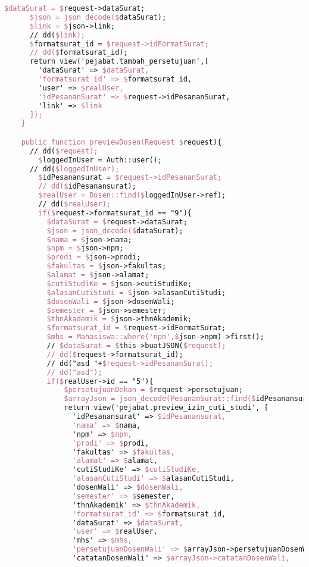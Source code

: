 \begin{lstlisting}[language=tex,basicstyle=\tiny,caption=PesanansuratController.php]
      $dataSurat = $request->dataSurat;
      $json = json_decode($dataSurat);
      $link = $json->link; 
      // dd($link);
      $formatsurat_id = $request->idFormatSurat;
      // dd($formatsurat_id);
      return view('pejabat.tambah_persetujuan',[
        'dataSurat' => $dataSurat,
        'formatsurat_id' => $formatsurat_id,
        'user' => $realUser,
        'idPesananSurat' => $request->idPesananSurat,
        'link' => $link
      ]);
    }

    public function previewDosen(Request $request){
      // dd($request);
        $loggedInUser = Auth::user();
      // dd($loggedInUser);
        $idPesanansurat = $request->idPesananSurat;
        // dd($idPesanansurat);
        $realUser = Dosen::find($loggedInUser->ref);
        // dd($realUser);
        if($request->formatsurat_id == "9"){
          $dataSurat = $request->dataSurat;
          $json = json_decode($dataSurat);
          $nama = $json->nama;
          $npm = $json->npm;
          $prodi = $json->prodi;
          $fakultas = $json->fakultas;
          $alamat = $json->alamat;
          $cutiStudiKe = $json->cutiStudiKe;
          $alasanCutiStudi = $json->alasanCutiStudi;
          $dosenWali = $json->dosenWali;
          $semester = $json->semester;
          $thnAkademik = $json->thnAkademik;
          $formatsurat_id = $request->idFormatSurat;
          $mhs = Mahasiswa::where('npm',$json->npm)->first();
          // $dataSurat = $this->buatJSON($request);
          // dd($request->formatsurat_id);
          // dd("asd "+$request->idPesananSurat);
          // dd("asd");
          if($realUser->id == "5"){
              $persetujuanDekan = $request->persetujuan;
              $arrayJson = json_decode(PesananSurat::find($idPesanansurat)->dataSurat);
              return view('pejabat.preview_izin_cuti_studi', [
                'idPesanansurat' => $idPesanansurat,
                'nama' => $nama,
                'npm' => $npm,
                'prodi' => $prodi,
                'fakultas' => $fakultas,
                'alamat' => $alamat,
                'cutiStudiKe' => $cutiStudiKe,
                'alasanCutiStudi' => $alasanCutiStudi,
                'dosenWali' => $dosenWali,
                'semester' => $semester,
                'thnAkademik' => $thnAkademik,
                'formatsurat_id' => $formatsurat_id,
                'dataSurat' => $dataSurat,
                'user' => $realUser,
                'mhs' => $mhs,
                'persetujuanDosenWali' => $arrayJson->persetujuanDosenWali,
                'catatanDosenWali' => $arrayJson->catatanDosenWali,

\end{lstlisting}
